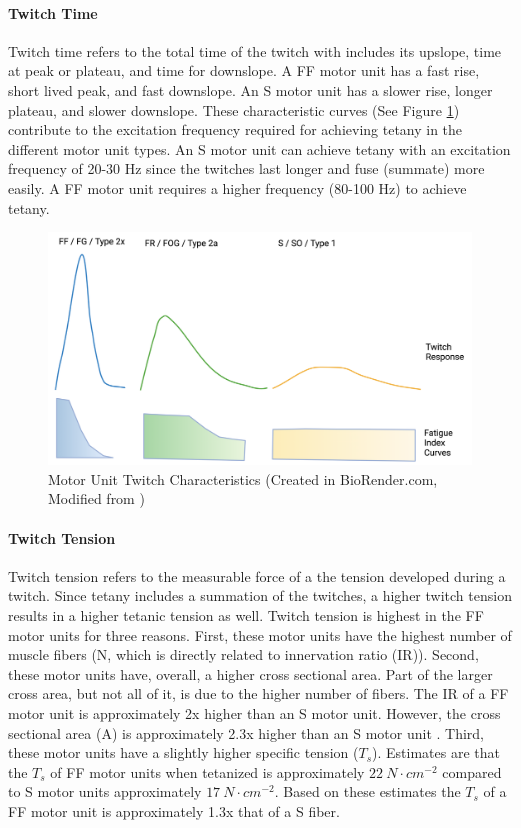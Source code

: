 \paragraph{Twitch Time}
Twitch time refers to the total time of the twitch with includes its upslope, time at peak or plateau, and time for downslope. A FF motor unit has a fast rise, short lived peak, and fast downslope. An S motor unit has a slower rise, longer plateau, and slower downslope. These characteristic curves (See Figure \ref{fig:mu_twitch}) contribute to the excitation frequency required for achieving tetany in the different motor unit types. An S motor unit can achieve tetany with an excitation frequency of 20-30 Hz since the twitches last longer and fuse (summate) more easily. A FF motor unit requires a higher frequency (80-100 Hz) to achieve tetany. 

\begin{figure}[!ht]
    \centering
    \includegraphics[width=1\linewidth]{./figure/mu_twitch.png}
    \caption{Motor Unit Twitch Characteristics \footnotesize{(Created in BioRender.com, Modified from \cite{jones_skeletal_2006}})}
    \label{fig:mu_twitch}
\end{figure}

\paragraph{Twitch Tension}
Twitch tension refers to the measurable force of a the tension developed during a twitch. Since tetany includes a summation of the twitches, a higher twitch tension results in a higher tetanic tension as well. Twitch tension is highest in the FF motor units for three reasons. First, these motor units have the highest number of muscle fibers (N, which is directly related to innervation ratio (IR)). Second, these motor units have, overall, a higher cross sectional area. Part of the larger cross area, but not all of it, is due to the higher number of fibers. The IR of a FF motor unit is approximately 2x higher than an S motor unit. However, the cross sectional area (A) is approximately 2.3x higher than an S motor unit \cite{bodine_maximal_1987, buchthal_motor_1980}. Third, these motor units have a slightly higher specific tension ($T_s$). Estimates are that the $T_s$ of FF motor units when tetanized is approximately $22 \ N \cdot cm^{-2}$ compared to S motor units approximately $17 \ N \cdot cm^{-2}$. Based on these estimates the $T_s$ of a FF motor unit is approximately 1.3x that of a S fiber. 

